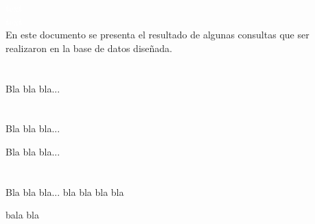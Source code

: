 \documentclass[12pt]{article}
\begin{document}
\title{}
	\author{}
	\date{}
\thispagestyle{miestilo}
\textcolor{white}{text}\\
\vspace{1cm}
\textcolor{white}{text}\\

En este documento se presenta el resultado de algunas consultas que ser realizaron en la base de datos diseñada. 
\newpage
\pagestyle{miestilo2}

\section{}
Bla bla bla...

\section{}


Bla bla bla...



Bla bla bla...

\section{}


Bla bla bla...
bla
bla
bla
bla
\vspace{30cm}

bala
bla
\end{document}
